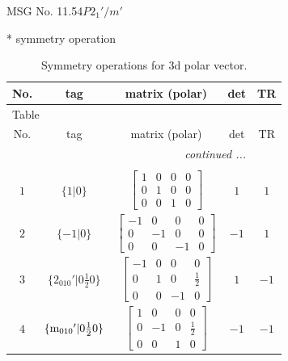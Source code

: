 \documentclass[fleqn,8pt]{jsarticle}
\begin{document}
\setcounter{MaxMatrixCols}{32}

\renewcommand{\tablename}{Table~}
\renewcommand{\figurename}{Figure~}
\begin{center}
\LARGE
MSG No. 11.54\quad$P2_{1}'/m'$
\end{center}
* symmetry operation
\renewcommand{\arraystretch}{1.3}
\begin{longtable}{ccccc}
\caption{Symmetry operations for 3d polar vector.}
 \\
 \hline \hline
No. & tag & matrix (polar) & det & TR \\ \hline \endfirsthead

\multicolumn{4}{l}{\tablename\ \thetable{}} \\
 \hline \hline
No. & tag & matrix (polar) & det & TR \\ \hline \endhead

 \hline \hline
\multicolumn{4}{r}{\footnotesize\it continued ...} \\ \endfoot

 \hline \hline
\multicolumn{4}{r}{} \\ \endlastfoot

$ 1 $ & $ \{1|0\} $ & $ \begin{bmatrix} 1 & 0 & 0 & 0 \\ 0 & 1 & 0 & 0 \\ 0 & 0 & 1 & 0 \end{bmatrix} $ & $ 1 $ & $ 1 $ \\ \hline
$ 2 $ & $ \{-1|0\} $ & $ \begin{bmatrix} -1 & 0 & 0 & 0 \\ 0 & -1 & 0 & 0 \\ 0 & 0 & -1 & 0 \end{bmatrix} $ & $ -1 $ & $ 1 $ \\ \hline
$ 3 $ & $ \{2{}_{010}{}'|0 \frac{1}{2} 0\} $ & $ \begin{bmatrix} -1 & 0 & 0 & 0 \\ 0 & 1 & 0 & \frac{1}{2} \\ 0 & 0 & -1 & 0 \end{bmatrix} $ & $ 1 $ & $ -1 $ \\ \hline
$ 4 $ & $ \{{\rm m}_{010}{}'|0 \frac{1}{2} 0\} $ & $ \begin{bmatrix} 1 & 0 & 0 & 0 \\ 0 & -1 & 0 & \frac{1}{2} \\ 0 & 0 & 1 & 0 \end{bmatrix} $ & $ -1 $ & $ -1 $ \\
\end{longtable}
\end{document}
